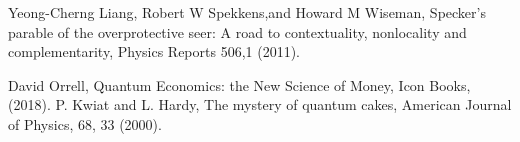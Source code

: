\documentclass[onecolumn,preprintnumbers,amsmath,amssymbn,reprint,nofootinbib,superscriptaddress]{revtex4}    %
\begin{document}
\begin{thebibliography}{}
 Yeong-Cherng Liang, Robert W Spekkens,and Howard M Wiseman,  Specker’s parable of the overprotective seer: A road to contextuality, nonlocality and complementarity, Physics Reports 506,1 (2011).

David Orrell, Quantum Economics:  the New Science of Money, Icon Books, (2018).
 P. Kwiat and L. Hardy, The mystery of quantum cakes, American Journal of Physics, 68, 33 (2000).

\end{thebibliography}
\end{document}
